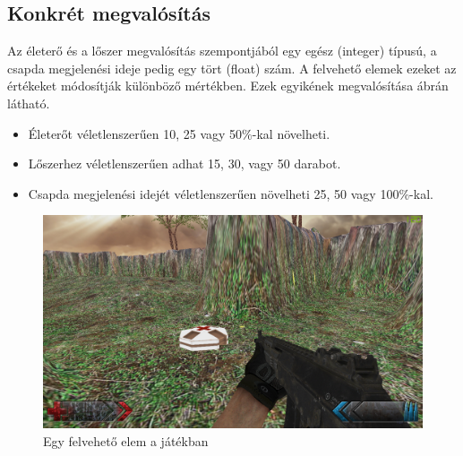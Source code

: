 \subsection{Konkrét megvalósítás}

Az életerő és a lőszer megvalósítás szempontjából egy egész (integer) típusú, a csapda megjelenési ideje pedig egy tört (float) szám. A felvehető elemek ezeket az értékeket módosítják különböző mértékben. Ezek egyikének megvalósítása  ábrán látható.

\begin{itemize}
\item Életerőt véletlenszerűen 10, 25 vagy 50\%-kal növelheti. 
\item Lőszerhez véletlenszerűen adhat 15, 30, vagy 50 darabot.
\item Csapda megjelenési idejét véletlenszerűen növelheti 25, 50 vagy 100\%-kal.
\end{itemize}

\begin{figure}[h]
\centering
\includegraphics[scale=0.4]{kepek/health.png}
\caption{Egy felvehető elem a játékban}
\label{fig:health}
\end{figure}

